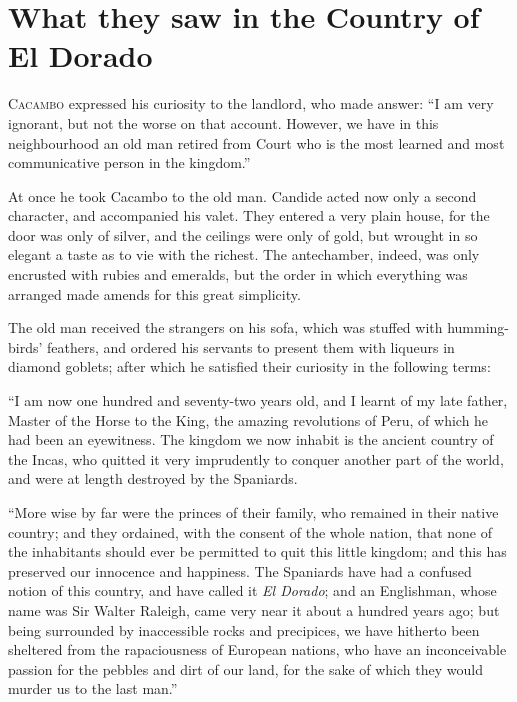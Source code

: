 \chapter{What they saw in the Country of El Dorado}
\thispagestyle{pter}
\vspace{-1cm}

\lettrine[lraise=0.1,slope=-.5em]{C}{acambo} expressed his curiosity to the landlord, who made answer:
``I am very ignorant, but not the worse on that account. However, we have in this neighbourhood an old man retired from Court who is the most learned and most communicative person in the kingdom.''

At once he took Cacambo to the old man. Candide acted now only a second character, and accompanied his valet. They entered a very plain house, for the door was only of silver, and the ceilings were only of gold, but wrought in so elegant a taste as to vie with the richest. The antechamber, indeed, was only encrusted with rubies and emeralds, but the order in which everything was arranged made amends for this great simplicity.

The old man received the strangers on his sofa, which was stuffed with humming-birds' feathers, and ordered his servants to present them with liqueurs in diamond goblets; after which he satisfied their curiosity in the following terms:

``I am now one hundred and seventy-two years old, and I learnt of my late father, Master of the Horse to the King, the amazing revolutions of Peru, of which he had been an eyewitness. The kingdom we now inhabit is the ancient country of the Incas, who quitted it very imprudently to conquer another part of the world, and were at length destroyed by the Spaniards.

``More wise by far were the princes of their family, who remained in their native country; and they ordained, with the consent of the whole nation, that none of the inhabitants should ever be permitted to quit this little kingdom; and this has preserved our innocence and happiness. The Spaniards have had a confused notion of this country, and have called it \textit{El Dorado}; and an Englishman, whose name was Sir Walter Raleigh, came very near it about a hundred years ago; but being surrounded by inaccessible rocks and precipices, we have hitherto been sheltered from the rapaciousness of European nations, who have an inconceivable passion for the pebbles and dirt of our land, for the sake of which they would murder us to the last man.''

